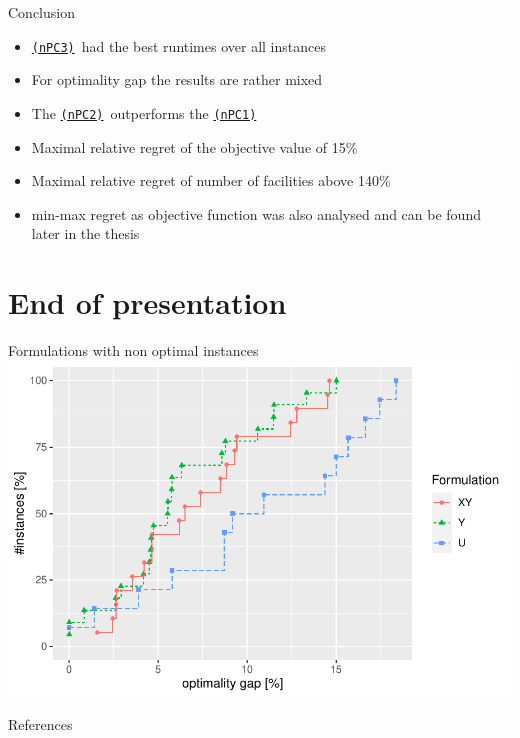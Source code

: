 \documentclass[utf8,aspectratio=169,ngerman,english]{beamer}
\newcommand{\nPC}{\hyperref[eq:nPC]{\texttt{(nPC1)}}}
\newcommand{\nPCE}{\hyperref[eq:nPCE]{\texttt{(nPC3)}}}
\newcommand{\nPCY}{\hyperref[eq:nPCY]{\texttt{(nPC2)}}}
\begin{document}
\begin{frame}{Conclusion}
    \begin{itemize}
        \item \nPCE\ had the best runtimes over all instances
        \item For optimality gap the results are rather mixed
        \item The \nPCY\ outperforms the \nPC
        \item Maximal relative regret of the objective value of 15\%
        \item Maximal relative regret of number of facilities above 140\%
        \item min-max regret as objective function was also analysed and can be found later in the thesis
    \end{itemize}
\end{frame}


\maketitle

\section*{End of presentation}

\begin{frame}{Formulations with non optimal instances}
    \centering
    \includegraphics[width = .65\linewidth, keepaspectratio]{images/gap_models_sH_nopt.pdf}
\end{frame}

\begin{frame}[allowframebreaks]{References}
    \printbibliography
\end{frame}
\end{document}
